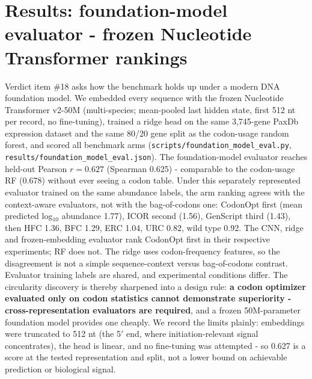 \documentclass[11pt]{article}
\begin{document}
\section{Results: foundation-model evaluator - frozen Nucleotide Transformer rankings}
\label{sec:foundation}
Verdict item \#18 asks how the benchmark holds up under a modern DNA foundation
model. We embedded every sequence with the frozen Nucleotide Transformer
v2-50M (multi-species; mean-pooled last hidden state, first 512 nt per record,
no fine-tuning), trained a ridge head on the same 3{,}745-gene PaxDb expression
dataset and the same 80/20 gene split as the codon-usage random forest, and
scored all benchmark arms (\texttt{scripts/foundation\_model\_eval.py},
\texttt{results/foundation\_model\_eval.json}). The foundation-model evaluator
reaches held-out Pearson $r=0.627$ (Spearman 0.625) - comparable to the
codon-usage RF (0.678) without ever seeing a codon table. Under this separately represented evaluator trained on the same abundance labels, the arm ranking agrees with the context-aware
evaluators, not with the bag-of-codons one: CodonOpt first (mean predicted
log$_{10}$ abundance 1.77), ICOR second (1.56), GenScript third (1.43), then
HFC 1.36, BFC 1.29, ERC 1.04, URC 0.82, wild type 0.92. The CNN, ridge and frozen-embedding evaluator rank CodonOpt first in their respective experiments; RF does not. The ridge uses codon-frequency features, so the disagreement is not a simple sequence-context versus bag-of-codons contrast. Evaluator training labels are shared, and experimental conditions differ. The
circularity discovery is thereby sharpened into a design rule: \textbf{a codon
optimizer evaluated only on codon statistics cannot demonstrate superiority -
cross-representation evaluators are required}, and a frozen 50M-parameter
foundation model provides one cheaply. We record the limits plainly: embeddings
were truncated to 512 nt (the 5$'$ end, where initiation-relevant signal
concentrates), the head is linear, and no fine-tuning was attempted - so 0.627 is a score at the tested representation and split, not a lower bound on achievable prediction or biological signal.
\end{document}
